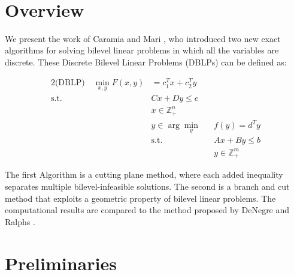 \documentclass{article}
\title{
	\centering
	\begin{figure}[!hb]
		\begin{minipage}{1\textwidth}
			\hspace*{-.06\linewidth}
		\end{minipage} 
	\end{figure}
	\vspace{5cm}
	{\huge\textbf{\Title}}\\ 
	\vspace{1cm}
	{\huge{\Seminar}\\}
	\vspace{0.6cm} 
	{\mdseries\large \Author }
	\vspace{1cm}
}
\begin{document}
	
	\maketitle
	\newpage
\section{Overview}

We present the work of Caramia and Mari \cite{Caramia2015}, who introduced two new exact algorithms for solving bilevel linear problems in which all the variables are discrete. These Discrete Bilevel Linear Problems (DBLPs) can be defined as:

		\begin{alignat*}{2}
		\text{(DBLP)} \quad \min_{x,y} F(x,y) &= c_1^Tx +c_2^Ty&& \\
		\text{s.t.} \quad &Cx + Dy \le e&& \\
		&x \in \mathbb{Z}^n_+ \\
		&y \in \arg \min_y&& f(y) = d^T y \\
		&\text{s.t.} &&Ax+By \le b \\
		& &&y \in \mathbb{Z}^m_+
		\end{alignat*}
		
The first Algorithm is a cutting plane method, where each added inequality separates multiple bilevel-infeasible solutions. The second is a branch and cut method that exploits a geometric property of bilevel linear problems. 
The computational results are compared to the method proposed by DeNegre and Ralphs \cite{DeNegre2009}.

\section{Preliminaries}
\end{document}
